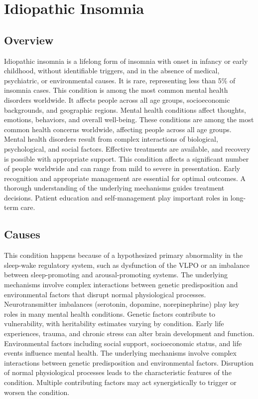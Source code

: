 \chapter{Idiopathic Insomnia}
\label{sec:Idiopathic Insomnia}

\section{Overview}
Idiopathic insomnia is a lifelong form of insomnia with onset in infancy or early childhood, without identifiable triggers, and in the absence of medical, psychiatric, or environmental causes. It is rare, representing less than 5\% of insomnia cases. This condition is among the most common mental health disorders worldwide. It affects people across all age groups, socioeconomic backgrounds, and geographic regions. Mental health conditions affect thoughts, emotions, behaviors, and overall well-being. These conditions are among the most common health concerns worldwide, affecting people across all age groups. Mental health disorders result from complex interactions of biological, psychological, and social factors. Effective treatments are available, and recovery is possible with appropriate support. This condition affects a significant number of people worldwide and can range from mild to severe in presentation. Early recognition and appropriate management are essential for optimal outcomes. A thorough understanding of the underlying mechanisms guides treatment decisions. Patient education and self-management play important roles in long-term care.
\section{Causes}
This condition happens because of a hypothesized primary abnormality in the sleep-wake regulatory system, such as dysfunction of the VLPO or an imbalance between sleep-promoting and arousal-promoting systems. The underlying mechanisms involve complex interactions between genetic predisposition and environmental factors that disrupt normal physiological processes. Neurotransmitter imbalances (serotonin, dopamine, norepinephrine) play key roles in many mental health conditions. Genetic factors contribute to vulnerability, with heritability estimates varying by condition. Early life experiences, trauma, and chronic stress can alter brain development and function. Environmental factors including social support, socioeconomic status, and life events influence mental health. The underlying mechanisms involve complex interactions between genetic predisposition and environmental factors. Disruption of normal physiological processes leads to the characteristic features of the condition. Multiple contributing factors may act synergistically to trigger or worsen the condition.
